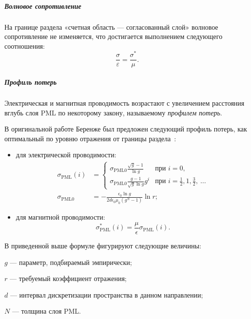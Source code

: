\subparagraph{Волновое сопротивление}
На границе раздела «счетная область --- согласованный слой» волновое
сопротивление не изменяется, что достигается выполнением следующего соотношения:
\begin{equation}
\label{eq:EpsilonAndMu}
\frac{\sigma}{\varepsilon} = \frac{\sigma^*}{\mu}.
\end{equation}

\subparagraph{Профиль потерь}
Электрическая и магнитная проводимость возрастают с увеличением расстояния
вглубь слоя PML по некоторому закону, называемому \emph{профилем потерь}.

В оригинальной работе Беренже был предложен следующий профиль потерь, как
оптимальный по уровню отражения от границы
раздела~\cite{bib:Berenger1994,bib:Berenger1996}:
\begin{itemize}

\item для электрической проводимости:
\begin{align}
\label{eq:LossProfile}
\sigma_\text{PML}(i) &= \left\{
\begin{array}{ll}
    \sigma_\text{PML0}\frac{\sqrt{g}-1}{\ln{g}}     & \text{при~} i=0,\\
    \sigma_\text{PML0}\frac{g-1}{\sqrt{g}\ln{g}}g^i & \text{при~} i=\frac12,1,\frac32,~\ldots
\end{array}
\right.\\
\sigma_\text{PML0} &= -\frac{\epsilon_0 \ln{g}} {2 d \epsilon_0\mu_0 (g^N-1)} \ln{r};
\end{align}

\item для магнитной проводимости:
\begin{equation}
    \sigma^{*}_\text{PML}(i) = \frac{\mu}{\epsilon} \sigma_\text{PML}(i).
\end{equation}

\end{itemize}

\noindent
В приведенной выше формуле фигурируют следующие величины:
\begin{where}
\item $g$ --- параметр, подбираемый эмпирически;
\item $r$ --- требуемый коэффициент отражения;
\item $d$ --- интервал дискретизации пространства в данном направлении;
\item $N$ --- толщина слоя PML.
\end{where}

